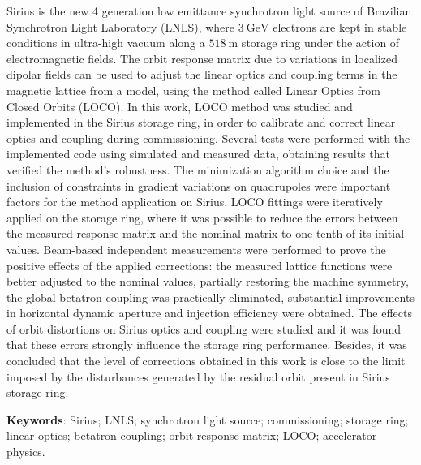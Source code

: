 \begin{resumo}
\renewcommand{\sfdefault}{\rmdefault}
    Sirius is the new 4 generation low emittance synchrotron light source of Brazilian Synchrotron Light Laboratory (LNLS), where $\SI{3}{\giga\electronvolt}$ electrons are kept in stable conditions in ultra-high vacuum along a $\SI{518}{\meter}$ storage ring under the action of electromagnetic fields. The orbit response matrix due to variations in localized dipolar fields can be used to adjust the linear optics and coupling terms in the magnetic lattice from a model, using the method called Linear Optics from Closed Orbits (LOCO). In this work, LOCO method was studied and implemented in the Sirius storage ring, in order to calibrate and correct linear optics and coupling during commissioning. Several tests were performed with the implemented code using simulated and measured data, obtaining results that verified the method's robustness. The minimization algorithm choice and the inclusion of constraints in gradient variations on quadrupoles were important factors for the method application on Sirius. LOCO fittings were iteratively applied on the storage ring, where it was possible to reduce the errors between the measured response matrix and the nominal matrix to one-tenth of its initial values. Beam-based independent measurements were performed to prove the positive effects of the applied corrections: the measured lattice functions were better adjusted to the nominal values, partially restoring the machine symmetry, the global betatron coupling was practically eliminated, substantial improvements in horizontal dynamic aperture and injection efficiency were obtained. The effects of orbit distortions on Sirius optics and coupling were studied and it was found that these errors strongly influence the storage ring performance. Besides, it was concluded that the level of corrections obtained in this work is close to the limit imposed by the disturbances generated by the residual orbit present in Sirius storage ring.
    
    \vspace{\onelineskip}
    \noindent\textbf{Keywords}: Sirius; LNLS; synchrotron light source; commissioning; storage ring; linear optics; betatron coupling; orbit response matrix; LOCO; accelerator physics.
    \vspace{\fill}
\end{resumo}

\renewcommand{\sfdefault}{\rmdefault}
\listoffigures*
\cleardoublepage


\renewcommand{\sfdefault}{\rmdefault}
\listoftables*
\cleardoublepage

\renewcommand{\sfdefault}{\rmdefault}
\printglossaries
\cleardoublepage


\renewcommand{\sfdefault}{\rmdefault}
\tableofcontents*
\cleardoublepage
